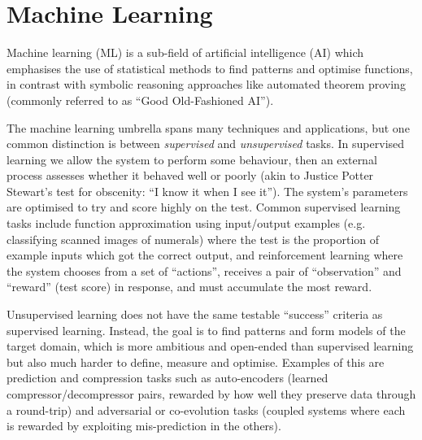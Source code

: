 \section{Machine Learning}

Machine learning (ML) is a sub-field of artificial intelligence (AI) which
emphasises the use of statistical methods to find patterns and optimise
functions, in contrast with symbolic reasoning approaches like automated theorem
proving (commonly referred to as ``Good Old-Fashioned AI'').

The machine learning umbrella spans many techniques and applications, but one
common distinction is between \emph{supervised} and \emph{unsupervised} tasks.
In supervised learning we allow the system to perform some behaviour, then an
external process assesses whether it behaved well or poorly (akin to Justice
Potter Stewart's test for obscenity: ``I know it when I see it''). The system's
parameters are optimised to try and score highly on the test. Common supervised
learning tasks include function approximation using input/output examples (e.g.
classifying scanned images of numerals) where the test is the proportion of
example inputs which got the correct output, and reinforcement learning where
the system chooses from a set of ``actions'', receives a pair of ``observation''
and ``reward'' (test score) in response, and must accumulate the most reward.

Unsupervised learning does not have the same testable ``success'' criteria as
supervised learning. Instead, the goal is to find patterns and form models of
the target domain, which is more ambitious and open-ended than supervised
learning but also much harder to define, measure and optimise. Examples of this
are prediction and compression tasks such as auto-encoders
(learned compressor/decompressor pairs, rewarded by how well they preserve data
through a round-trip) and adversarial or co-evolution tasks (coupled systems
where each is rewarded by exploiting mis-prediction in the others).
